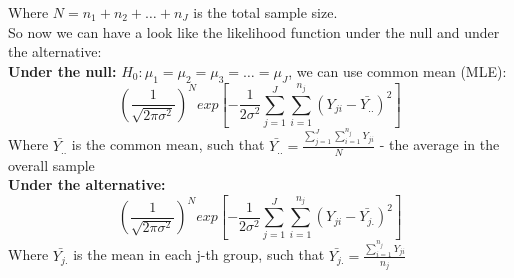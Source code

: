 \documentclass[12pt ]{article}
\begin{document}
Where $N = n_{1} + n_{2} + \ldots + n_{J}$ is the total sample size. \\

So now we can have a look like the likelihood function under the null and under the alternative: \\
\textbf{Under the null:} $H_{0}: \mu_{1} = \mu_{2} = \mu_{3} = \ldots = \mu_{J}$, we can use common mean (MLE):
\begin{equation*}
(\frac{1}{\sqrt{2 \pi \sigma^2}})^{N} exp[ - \frac{1}{2 \sigma^2} \sum_{j=1}^{J}\sum^{n_{j}}_{i=1} (Y_{ji} - \bar{Y_{..}})^2]
\end{equation*}
Where $\bar{Y_{..}}$ is the common mean, such that $\bar{Y_{..}} = \frac{\sum_{j=1}^{J}\sum^{n_{j}}_{i=1} Y_{ji}}{N}$ - the average in the overall sample\\
\textbf{Under the alternative:}
\begin{equation*}
(\frac{1}{\sqrt{2 \pi \sigma^2}})^{N} exp[ - \frac{1}{2 \sigma^2} \sum_{j=1}^{J}\sum^{n_{j}}_{i=1} (Y_{ji} - \bar{Y_{j.}})^2]
\end{equation*}
Where $\bar{Y_{j.}}$ is the mean in each j-th group, such that $\bar{Y_{j.}} = \frac{\sum_{i=1}^{n_{j}} Y_{ji}}{n_{j}}$ \\
\end{document}
